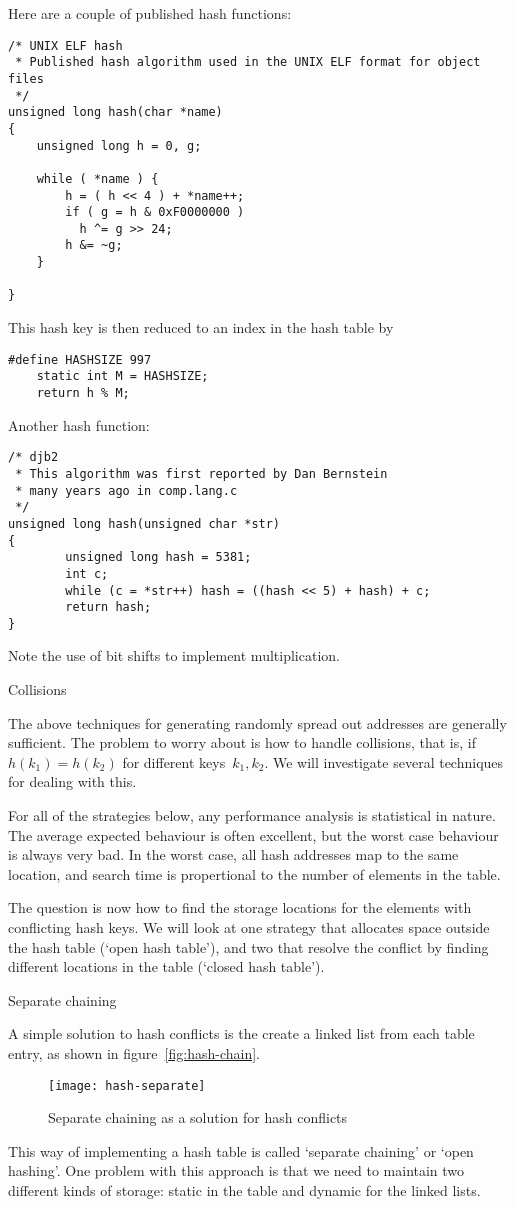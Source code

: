 Here are a couple of published hash functions:
\begin{verbatim}
/* UNIX ELF hash
 * Published hash algorithm used in the UNIX ELF format for object files
 */
unsigned long hash(char *name)
{
    unsigned long h = 0, g;

    while ( *name ) {
        h = ( h << 4 ) + *name++;
        if ( g = h & 0xF0000000 )
          h ^= g >> 24;
        h &= ~g;
    }

}
\end{verbatim}
This hash key is then reduced to an index in the hash table by
\begin{verbatim}
#define HASHSIZE 997
    static int M = HASHSIZE;
    return h % M;
\end{verbatim}
Another hash function:
\begin{verbatim}
/* djb2
 * This algorithm was first reported by Dan Bernstein
 * many years ago in comp.lang.c
 */
unsigned long hash(unsigned char *str)
{
        unsigned long hash = 5381;
        int c; 
        while (c = *str++) hash = ((hash << 5) + hash) + c;
        return hash;
}
\end{verbatim}
Note the use of bit shifts to implement multiplication.

 {Collisions}

The above techniques for generating randomly spread out addresses are
generally sufficient. The problem to worry about is how to handle
collisions, that is, if $h(k_1)=h(k_2)$ for different
keys~$k_1,k_2$. We will investigate several techniques for dealing
with this.

For all of the strategies below, any
performance analysis is statistical in nature. The average expected
behaviour is often excellent, but the worst case behaviour is always
very bad. In the worst case, all hash addresses map to the same
location, and search time is propertional to the number of elements in
the table.

The question is now how to find the storage locations for the elements
with conflicting hash keys. We will look at one strategy that
allocates space outside the hash table (`open hash table'), and two
that resolve the conflict by finding different locations in the table
(`closed hash table').

 {Separate chaining}

A simple solution to hash conflicts is the create a linked list from
each table entry, as shown in figure~\ref{fig:hash-chain}.
\begin{figure}
\texttt{[image: hash-separate]}
\caption{Separate chaining as a solution for hash conflicts}
\label{fig:hash-separate}
\end{figure}
This way of implementing a hash table is called `separate chaining' or `open hashing'.
One problem with this approach is that we need to maintain two
different kinds of storage: static in the table and dynamic for the
linked lists.

